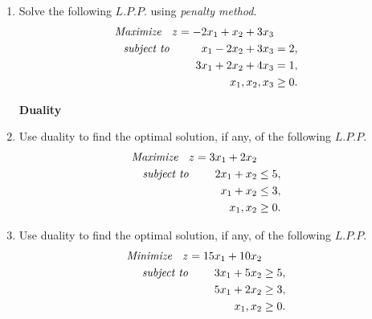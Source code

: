\documentclass[11pt, a4paper]{article}
\begin{document}
\begin{enumerate}
\vspace{20pt}


\item Solve the following $L.P.P.$ using \textit{penalty method}.
	\begin{align*}
\textit{Maximize \hspace{6pt}} z = -2x_1 + x_2 + 3x_3 \\
\textit{subject to \hspace{25pt}} x_1 - 2x_2 + 3x_3 &= 2, \\
3x_1 + 2x_2 + 4x_3 &= 1, \\
x_1, x_2, x_3 &\geq 0.
	\end{align*}
	





















\newpage

\begin{center}
\textbf{\huge Duality}
\end{center}

\vspace{50pt}

\item Use duality to find the optimal solution, if any, of the following $L.P.P.$
	\begin{align*}
\textit{Maximize \hspace{6pt}} z = 3x_1 + 2x_2 \\
\textit{subject to \hspace{20pt}} 2x_1 + x_2 &\leq 5, \\
x_1 + x_2 &\leq 3, \\
x_1, x_2 &\geq 0.
	\end{align*}
	
	

\vspace{30pt}


\item Use duality to find the optimal solution, if any, of the following $L.P.P.$
	\begin{align*}
\textit{Minimize \hspace{6pt}} z = 15x_1 + 10x_2 \\
\textit{subject to \hspace{20pt}} 3x_1 + 5x_2 &\geq 5, \\
5x_1 + 2x_2 &\geq 3, \\
x_1, x_2 &\geq 0.
	\end{align*}
	











\end{enumerate}
\end{document}
